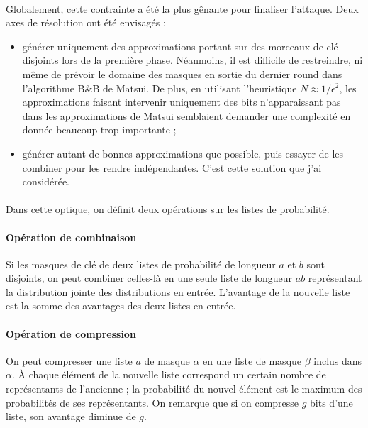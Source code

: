 \documentclass{scrartcl}
\begin{document}
\paragraph*{}
Globalement, cette contrainte a été la plus gênante pour finaliser l'attaque. Deux axes de
résolution ont été envisagés :

\begin{itemize}
	\item générer uniquement des approximations portant sur des morceaux de clé disjoints lors de la première phase.
	Néanmoins, il est difficile de restreindre, ni même de prévoir le domaine des masques en sortie du dernier round dans
	l'algorithme B\&B de Matsui. De plus, en utilisant l'heuristique $N \approx 1/\epsilon^2$, les approximations faisant intervenir
	uniquement des bits n'apparaissant pas dans les approximations de Matsui semblaient demander une complexité en donnée
	beaucoup trop importante ;
	\item générer autant de bonnes approximations que possible, puis essayer de les combiner pour
	les rendre indépendantes. C'est cette solution que j'ai considérée.
\end{itemize}

\paragraph*{}
Dans cette optique, on définit deux opérations sur les listes de probabilité.

\paragraph{Opération de combinaison}
Si les masques de clé de deux listes de probabilité de longueur $a$ et
$b$ sont disjoints, on peut combiner celles-là en une seule liste de longueur $ab$ représentant la distribution
jointe des distributions en entrée. L'avantage de la nouvelle liste est la somme des avantages des deux listes
en entrée.


\paragraph{Opération de compression}
On peut compresser une liste $a$ de masque $\alpha$ en une liste de masque $\beta$ inclus dans $\alpha$. À chaque
élément de la nouvelle liste correspond un certain nombre de représentants de l'ancienne ; la probabilité
du nouvel élément est le maximum des probabilités de ses représentants. On remarque que si on compresse $g$ bits d'une
liste, son avantage diminue de $g$. 
\end{document}
